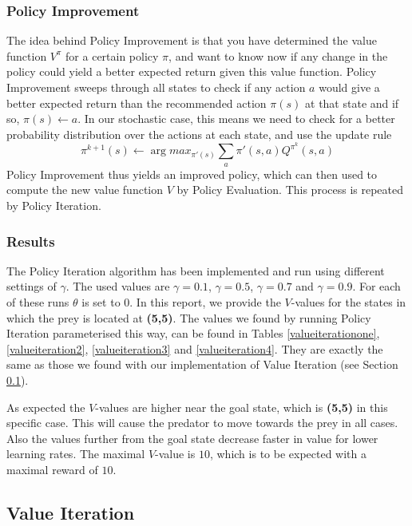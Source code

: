 \documentclass{article}
\begin{document}
\subsubsection{Policy Improvement}\label{policyImprovement}
The idea behind Policy Improvement is that you have determined the value function $V^{\pi}$ for a certain policy $\pi$, and want to know now if any change in the policy could yield a better expected return given this value function. Policy Improvement sweeps through all states to check if any action  $a$ would give a better expected return than the recommended action $\pi(s)$ at that state and if so, $\pi(s) \leftarrow a$. In our stochastic case, this means we need to check for a better probability distribution over the actions at each state, and use the update rule
\begin{equation}
\pi^{k+1}(s) \leftarrow 
			\arg max_{\pi'(s)} \sum_{a} \pi'(s,a) Q^{\pi^{k}}(s,a)
\end{equation}
Policy Improvement thus yields an improved policy, which can then used to compute the new value function $V$ by Policy Evaluation. This process is repeated by Policy Iteration.


\subsubsection{Results}
The Policy Iteration algorithm has been implemented and run using different settings of $\gamma$. The used values are $\gamma = 0.1$, $\gamma = 0.5$, $\gamma = 0.7$ and $\gamma = 0.9$. 
For each of these runs $\theta$ is set to 0. 
In this report, we provide the $V$-values for the states in which the prey is located at \textbf{(5,5)}. 
The values we found by running Policy Iteration parameterised this way, can be found in Tables \ref{valueiterationone}, \ref{valueiteration2}, \ref{valueiteration3} and \ref{valueiteration4}. They are exactly the same as those we found with our implementation of Value Iteration (see Section \ref{sec:valueIteration}).

As expected the $V$-values are higher near the goal state, which is \textbf{(5,5)} in this specific case. This will cause the predator to move towards the prey in all cases. Also the values further from the goal state decrease faster in value for lower learning rates. The maximal $V$-value is $10$, which is to be expected with a maximal reward of $10$.



\subsection{Value Iteration}\label{sec:valueIteration}
\end{document}
